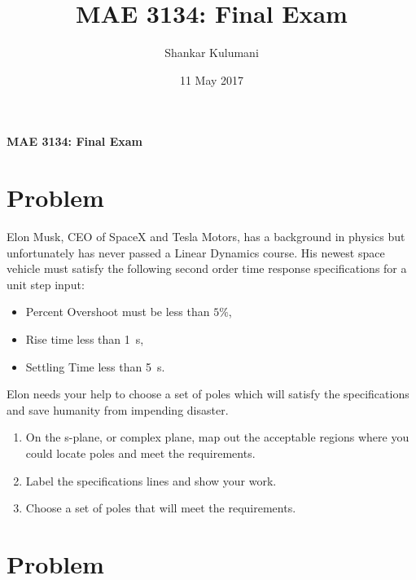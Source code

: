 \documentclass[11pt, reqno]{article}    %
\title{MAE 3134: Final Exam}
\author{Shankar Kulumani}
\date{11 May 2017}                          %
\begin{document}
{\noindent\Large \textbf{MAE 3134: Final Exam}}

\section{Problem}\label{prob:sys_response_to_poles}
Elon Musk, CEO of SpaceX and Tesla Motors, has a background in physics but unfortunately has never passed a Linear Dynamics course. 
His newest space vehicle must satisfy the following second order time response specifications for a unit step input:
\begin{itemize}
    \item Percent Overshoot must be less than \(5 \%\),
    \item Rise time less than \SI{1}{\second},
    \item Settling Time less than \SI{5}{\second}.
\end{itemize}
Elon needs your help to choose a set of poles which will satisfy the specifications and save humanity from impending disaster.
\begin{enumerate}
    \item On the s-plane, or complex plane, map out the acceptable regions where you could locate poles and meet the requirements. 
    \item Label the specifications lines and show your work.
    \item Choose a set of poles that will meet the requirements.
\end{enumerate}

\begin{figure}[htbp]
\centering
\begin{scaletikzpicturetowidth}{0.8\textwidth}
\end{scaletikzpicturetowidth}
\end{figure}

\clearpage
\section{Problem}\label{prob:bode_response_analysis}
\end{document}
